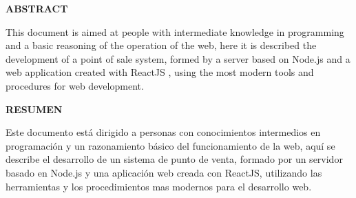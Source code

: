 \begin{center}
  {\Large \bf{ABSTRACT}}
\end{center}
This document is aimed at people with intermediate knowledge in programming and a basic reasoning of the operation of the web, here it is described the development of a point of sale system, formed by a server based on Node.js and a web application created with ReactJS , using the most modern tools and procedures for web development.
\vspace{0.8cm}


\newpage
\begin{center}
  {\Large \bf{RESUMEN}}
\end{center}
Este documento está dirigido a personas con conocimientos intermedios en programación y un razonamiento básico del funcionamiento de la web, aquí se describe el desarrollo de un sistema de punto de venta, formado por un servidor basado en Node.js y una aplicación web creada con ReactJS, utilizando las herramientas y los procedimientos mas modernos para el desarrollo web. 
\vspace{0.8cm}